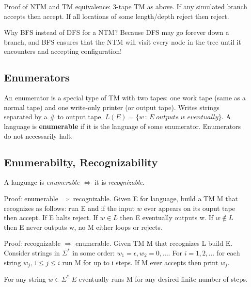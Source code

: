 Proof of NTM and TM equivalence: 3-{}tape TM as above. If any simulated branch accepts then accept. If all locations of some length\slash depth reject then reject.

Why BFS instead of DFS for a NTM? Because DFS may go forever down a branch, and BFS ensures that the NTM will visit every node in the tree until it encounters and accepting configuration!

\vfill \columnbreak

\subsection{Enumerators}
\label{enumerators}

An enumerator is a special type of TM with two tapes: one work tape (same as a normal tape) and one write-{}only printer (or output tape). Writes strings separated by a \# to output tape. $L(E) = \{w\, :\, E\; outputs\; w\; eventually\}$. A language is \textbf{enumerable} if it is the language of some enumerator. Enumerators do not necessarily halt.

\subsection{Enumerabilty, Recognizability}
\label{enumerabiltyrecognizability}

A language is \emph{enumerable} $\Leftrightarrow$ it is \emph{recognizable}.

Proof: enumerable $\Rightarrow$ recognizable. Given E for language, build a TM M that recognizes as follows: run E and if the input $w$ ever appears on its ouput tape then accept. If E halts reject. If $w\in L$ then E eventually outputs w. If $w\notin L$ then E never outputs w, no M either loops or rejects.

Proof: recognizable $\Rightarrow$ enumerable. Given TM M that recognizes L build E. Consider strings in $\Sigma^*$ in some order: $w_1=\epsilon,w_2=0,\dotsc$. For $i=1,2,\dotsc$ for each string $w_j,1\leq j\leq i$ run M for up to i steps. If M ever accepts then print $w_j$.

For any string $w\in \Sigma^*$ $E$ eventually runs M for any desired finite number of steps.



